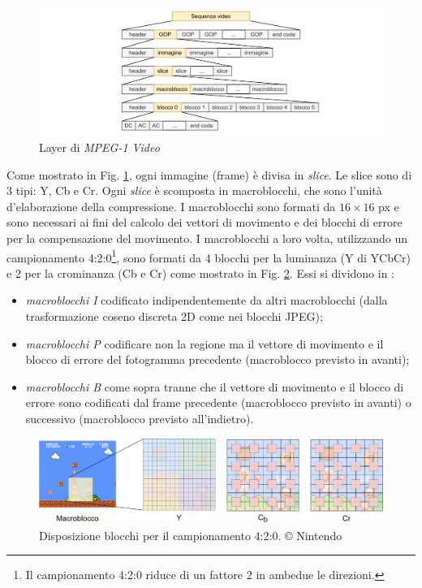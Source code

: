\begin{figure}[H]
	\includegraphics[width=\linewidth]{immagini/MPEG_layers}
	\caption{Layer di \textit{MPEG-1 Video}}
	\label{fig:MPEG_layers}
\end{figure}

Come mostrato in Fig. \ref{fig:MPEG_layers}, ogni immagine (frame) è divisa in \textit{slice}. Le slice sono di 3 tipi: Y, Cb e Cr. Ogni \textit{slice} è scomposta in macroblocchi, che sono l'unità d'elaborazione della compressione. I macroblocchi sono formati da $16\times16$ px e sono necessari ai fini del calcolo dei vettori di movimento e dei blocchi di errore per la compensazione del movimento. I macroblocchi a loro volta, utilizzando un campionamento 4:2:0\footnote{Il campionamento 4:2:0 riduce di un fattore 2 in ambedue le direzioni.}, sono formati da 4 blocchi per la luminanza (Y di YCbCr) e 2 per la crominanza (Cb e Cr) come mostrato in Fig. \ref{fig:macroblocchi}. Essi si dividono in \parencite{ProgettazioneEproduzioneMultimediale}:

\begin{itemize}
	\item \textit{macroblocchi I} codificato indipendentemente da altri macroblocchi (dalla trasformazione coseno discreta 2D come nei blocchi JPEG);
	\item \textit{macroblocchi P} codificare non la regione ma il vettore di movimento e il blocco di errore del fotogramma precedente (macroblocco previsto in avanti);
	\item \textit{macroblocchi B} come sopra tranne che il vettore di movimento e il blocco di errore sono codificati dal frame precedente (macroblocco previsto in avanti) o successivo (macroblocco previsto all'indietro).
\end{itemize}

\begin{figure}[H]
	\includegraphics[width=\linewidth]{immagini/macroblocchi}
	\centering
	\caption{Disposizione blocchi per il campionamento 4:2:0. © Nintendo}
	\label{fig:macroblocchi}
\end{figure}

